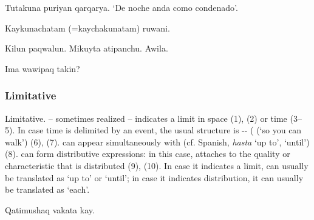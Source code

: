 {%
{Tutakuna puriyan qarqarya.}%
{}%
%
{`De noche anda como condenado'.}%
{}{}%

%
{Kaykunachatam (=kaychakunatam) ruwani.}%
{}%
{}{}%

%
{Kilun paqwalun. Mikuyta atipanchu. Awila.}%
{}%
{}{}%

%
{\textquestiondown{}Ima wawipaq takin?}%
{}%
{}{}%

\subsubsection{Limitative }\label{ssec:limkama}
Limitative.  -- sometimes realized  -- indicates a limit in space (1), (2) or time (3--5). In case time is delimited by an event, the usual structure is -- ( (`so you can walk') (6), (7).  can appear simultaneously with  (cf. Spanish, \emph{hasta} `up to', `until') (8).  can form distributive expressions: in this case,  attaches to the quality or characteristic that is distributed (9), (10). In case it indicates a limit,  can usually be translated as `up to' or `until'; in case it indicates distribution, it can usually be translated as `each'.

%
{Qatimushaq vakata kay.}%
{}%
{}{}%

}
